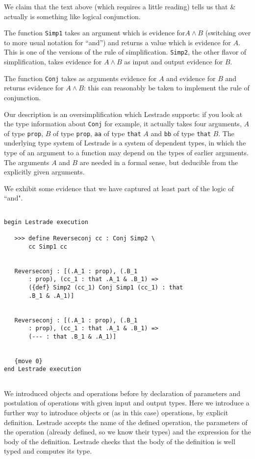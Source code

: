 \documentclass[12pt]{article}
\begin{document}
We claim that the text above (which requires a little reading) tells us that \& actually is something like logical conjunction.

The function {\tt Simp1} takes an argument which is evidence for$A \wedge B$ (switching over to more usual notation for ``and'') and returns a value which is evidence for $A$.  This is one of the versions of the rule of simplification.  {\tt Simp2}, the other flavor of simplification, takes evidence for $A \wedge B$ as input and output evidence for $B$.

The function {\tt Conj} takes as arguments evidence for $A$ and evidence for $B$ and returns evidence for $A\wedge B$:  this can reasonably be taken to implement the rule of conjunction.

Our description is an oversimplification which Lestrade supports:  if you look at the type information about {\tt Conj} for example, it actually takes four arguments, $A$ of type {\tt prop}, $B$ of type {\tt prop}, {\tt aa} of type {\tt that} $A$ and
{\tt bb} of type {\tt that} $B$.   The underlying type system of Lestrade is a system of dependent types, in which the type of an argument to a function may depend on the types of earlier arguments.   The arguments $A$ and $B$ are needed in a formal sense, but deducible from the explicitly given arguments.

We exhibit some evidence that we have captured at least part of the logic of ``and".

\begin{verbatim}

begin Lestrade execution

   >>> define Reverseconj cc : Conj Simp2 \
       cc Simp1 cc


   Reverseconj : [(.A_1 : prop), (.B_1 
       : prop), (cc_1 : that .A_1 & .B_1) => 
       ({def} Simp2 (cc_1) Conj Simp1 (cc_1) : that 
       .B_1 & .A_1)]


   Reverseconj : [(.A_1 : prop), (.B_1 
       : prop), (cc_1 : that .A_1 & .B_1) => 
       (--- : that .B_1 & .A_1)]


   {move 0}
end Lestrade execution


\end{verbatim}

We introduced objects and operations before by declaration of parameters and postulation of operations with given input and output types.  Here we introduce a further way to introduce objects or (as in this case) operations, by explicit definition.  Lestrade accepts the name of the defined operation, the parameters of the operation (already defined, so we know their types) and the expression for the body of the definition.  Lestrade checks that the body of the definition is well typed and computes its type.
\end{document}
